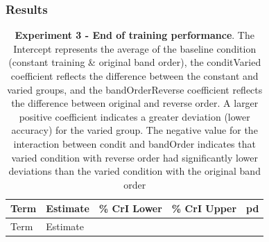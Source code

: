 \documentclass[
  11pt,
  letterpaper,
]{article}
\begin{document}
\subsubsection{Results}\label{results-4}

\begin{longtable}[]{@{}
  >{\raggedright\arraybackslash}p{}
  >{\raggedleft\arraybackslash}p{}
  >{\raggedleft\arraybackslash}p{}
  >{\raggedleft\arraybackslash}p{}
  >{\raggedleft\arraybackslash}p{}@{}}
\caption{\textbf{Experiment 3 - End of training performance}. The
Intercept represents the average of the baseline condition (constant
training \& original band order), the conditVaried coefficient reflects
the difference between the constant and varied groups, and the
bandOrderReverse coefficient reflects the difference between original
and reverse order. A larger positive coefficient indicates a greater
deviation (lower accuracy) for the varied group. The negative value for
the interaction between condit and bandOrder indicates that varied
condition with reverse order had significantly lower deviations than the
varied condition with the original band
order}\label{tbl-e3-train-dist}\tabularnewline
\toprule\noalign{}
\begin{minipage}[b]{\linewidth}\raggedright
Term
\end{minipage} & \begin{minipage}[b]{\linewidth}\raggedleft
Estimate
\end{minipage} & \begin{minipage}[b]{\linewidth}\raggedleft
95\% CrI Lower
\end{minipage} & \begin{minipage}[b]{\linewidth}\raggedleft
95\% CrI Upper
\end{minipage} & \begin{minipage}[b]{\linewidth}\raggedleft
pd
\end{minipage} \\
\midrule\noalign{}
\endfirsthead
\toprule\noalign{}
\begin{minipage}[b]{\linewidth}\raggedright
Term
\end{minipage} & \begin{minipage}[b]{\linewidth}\raggedleft
Estimate
\end{minipage} & \begin{minipage}[b]{\linewidth}\raggedleft

\end{minipage}
\end{longtable}
\end{document}
